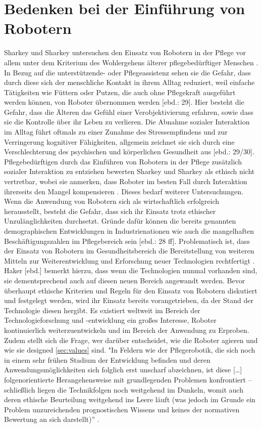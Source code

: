 \section{Bedenken bei der Einführung von Robotern}
Sharkey und Sharkey untersuchen den Einsatz von Robotern in der Pflege vor allem unter dem Kriterium des Wohlergehens älterer pflegebedürftiger Menschen \cite[S. 28]{sharky}. In Bezug auf die unterstützende- oder Pflegeassistenz sehen sie die Gefahr, dass durch diese sich der menschliche Kontakt in ihrem Alltag reduziert, weil einfache Tätigkeiten wie Füttern oder Putzen, die auch ohne Pflegekraft ausgeführt werden können, von Roboter übernommen werden [ebd.: 29]. Hier besteht die Gefahr, dass die Älteren das Gefühl einer Verobjektivierung erfahren, sowie dass sie die Kontrolle über ihr Leben zu verlieren. Die Abnahme sozialer Interaktion im Alltag führt oftmals zu einer Zunahme des Stressempfindens und zur Verringerung kognitiver Fähigkeiten, allgemein zeichnet sie sich durch eine Verschlechterung des psychischen und körperlichen Gesundheit aus [ebd.: 29/30]. Pflegebedürftigen durch das Einführen von Robotern in der Pflege zusätzlich sozialer Interaktion zu entziehen bewerten Sharkey und Sharkey als ethisch nicht vertretbar, wobei sie anmerken, dass Roboter im besten Fall durch Interaktion ihrerseits den Mangel kompensieren \cite[S. 30]{sharky}. Dieses bedarf weiterer Untersuchungen.\\Wenn die Anwendung von Robotern sich als wirtschaftlich erfolgreich herausstellt, besteht die Gefahr, dass sich ihr Einsatz trotz ethischer Unzulänglichkeiten durchsetzt. Gründe dafür können die bereits genannten demographischen Entwicklungen in Industrienationen wie auch die mangelhaften Beschäftigungszahlen im Pflegebereich sein [ebd.: 28 ff].
Problematisch ist, dass der Einsatz von Robotern im Gesundheitsbereich die Bereitstellung von  weiteren Mitteln zur Weiterentwicklung und Erforschung neuer Technologien rechtfertigt \cite[57]{haker}. Haker [ebd.] bemerkt hierzu, dass wenn die Technologien nunmal vorhanden sind, sie dementsprechend auch auf diesen neuen Bereich angewandt werden. Bevor überhaupt ethische Kriterien und Regeln für den Einsatz von Robotern diskutiert und festgelegt werden, wird ihr Einsatz bereits vorangetrieben, da der Stand der Technologie diesen hergibt. Es existiert weltweit im Bereich der Technologieforschung und -entwicklung ein großes Interesse, Roboter kontinuierlich weiterzuentwickeln und im Bereich der Anwendung zu Erproben. Zudem stellt sich die Frage, wer darüber entscheidet, wie die Roboter agieren und wie sie designed \ref{sec:values} sind. "In  Feldern  wie  der  Pflegerobotik,  die  sich  noch  in  einem  sehr  frühen  Stadium  der  Entwicklung  befinden  und  deren  Anwendungsmöglichkeiten  sich  folglich  erst  unscharf  abzeichnen,  ist  diese  […] folgenorientierte  Herangehensweise  mit  grundlegenden Problemen  konfrontiert  –  schließlich  liegen  die  Technikfolgen  noch  weitgehend  im  Dunkeln,  womit  auch  deren  ethische  Beurteilung weitgehend ins Leere läuft (was jedoch im Grunde ein Problem unzureichenden prognostischen Wissens und keines der normativen Bewertung an sich darstellt)” \cite[S. 148]{kehl}.